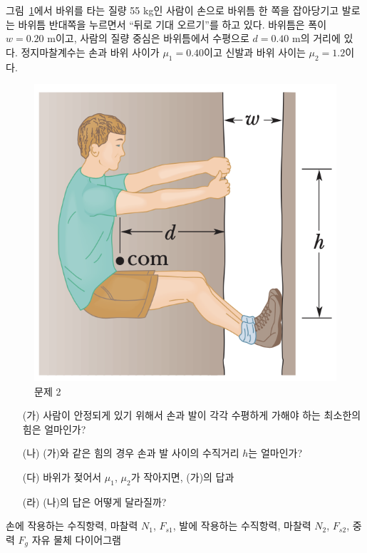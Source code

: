 \documentclass[floatfix,nofootinbib,superscriptaddress,fleqn]{revtex4-2}
\begin{document}
그림~\ref{fig:2}에서 바위를 타는 질량 55 kg인 사람이 손으로 바위틈 한
쪽을 잡아당기고 발로는 바위틈 반대쪽을 누르면서 ``뒤로 기대 오르기''를
하고 있다. 바위틈은 폭이 $w=0.20$ m이고, 사람의 질량 중심은 바위틈에서
수평으로 $d=0.40$ m의 거리에 있다. 정지마찰계수는 손과 바위 사이가
$\mu_1=0.40$이고 신발과 바위 사이는 $\mu_2=1.2$이다.  
\begin{figure}[ht]
  \centering
\includegraphics[scale=0.6]{Qfig15-2-20220502.png}
  \caption{문제 2}
  \label{fig:2}
\end{figure}
\begin{itemize}
\item[(가)] 사람이 안정되게 있기 위해서 손과 발이 각각 수평하게 가해야
  하는 최소한의 힘은 얼마인가?
\item[(나)] (가)와 같은 힘의 경우 손과 발 사이의 수직거리 $h$는
  얼마인가?
\item[(다)]  바위가 젖어서 $\mu_1$, $\mu_2$가 작아지면, (가)의
  답과
\item[(라)] (나)의 답은 어떻게 달라질까?
\end{itemize}

 손에 작용하는 수직항력, 마찰력 $N_1$, $F_{s1}$, 발에 작용하는
수직항력, 마찰력 $N_2$, $F_{s2}$, 중력 $F_g$ 자유 물체 다이어그램
\end{document}
